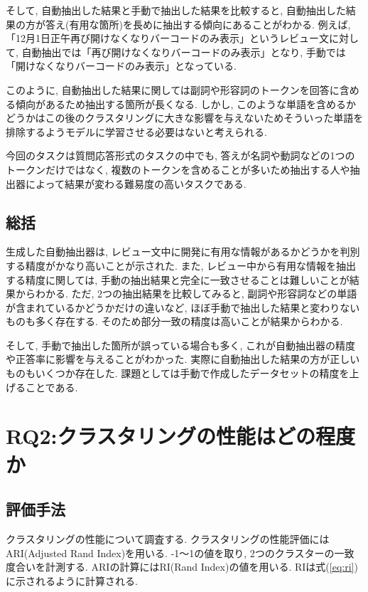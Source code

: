 そして, 自動抽出した結果と手動で抽出した結果を比較すると, 自動抽出した結果の方が答え(有用な箇所)を長めに抽出する傾向にあることがわかる. 
例えば, 「12月1日正午再び開けなくなりバーコードのみ表示」というレビュー文に対して, 自動抽出では「再び開けなくなりバーコードのみ表示」となり, 手動では「開けなくなりバーコードのみ表示」となっている. 

このように, 自動抽出した結果に関しては副詞や形容詞のトークンを回答に含める傾向があるため抽出する箇所が長くなる. しかし, このような単語を含めるかどうかはこの後のクラスタリングに大きな影響を与えないためそういった単語を排除するようモデルに学習させる必要はないと考えられる. 

今回のタスクは質問応答形式のタスクの中でも, 答えが名詞や動詞などの1つのトークンだけではなく, 複数のトークンを含めることが多いため抽出する人や抽出器によって結果が変わる難易度の高いタスクである. 


\subsection{総括}
生成した自動抽出器は, レビュー文中に開発に有用な情報があるかどうかを判別する精度がかなり高いことが示された. 
また, レビュー中から有用な情報を抽出する精度に関しては, 手動の抽出結果と完全に一致させることは難しいことが結果からわかる. ただ, 2つの抽出結果を比較してみると, 副詞や形容詞などの単語が含まれているかどうかだけの違いなど, ほぼ手動で抽出した結果と変わりないものも多く存在する. そのため部分一致の精度は高いことが結果からわかる. 

そして, 手動で抽出した箇所が誤っている場合も多く, これが自動抽出器の精度や正答率に影響を与えることがわかった. 実際に自動抽出した結果の方が正しいものもいくつか存在した. 課題としては手動で作成したデータセットの精度を上げることである. 


\section{RQ2:クラスタリングの性能はどの程度か}
\subsection{評価手法}
クラスタリングの性能について調査する. クラスタリングの性能評価にはARI(Adjusted Rand Index)を用いる. -1〜1の値を取り, 2つのクラスターの一致度合いを計測する. 
ARIの計算にはRI(Rand Index)の値を用いる. RIは式(\ref{eq:ri})に示されるように計算される. 

